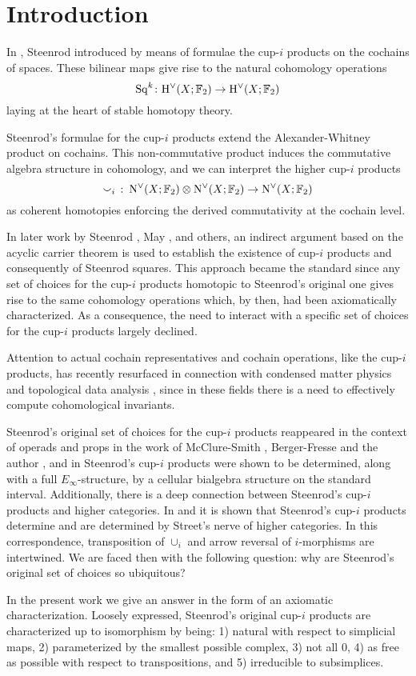 
\section{Introduction} \label{s:introduction}

In \cite{steenrod1947products}, Steenrod introduced by means of formulae the cup-$i$ products on the cochains of spaces.
These bilinear maps give rise to the natural cohomology operations
\[
\mathrm{Sq}^k \colon \mathrm{H}^\vee(X; {\mathbb{F}_2}) \to \mathrm{H}^\vee(X; {\mathbb{F}_2})
\]
laying at the heart of stable homotopy theory.

Steenrod's formulae for the cup-$i$ products extend the Alexander-Whitney product on cochains.
This non-commutative product induces the commutative algebra structure in cohomology, and we can interpret the higher cup-$i$ products
\[
\smallsmile_i\ \colon \operatorname{N^{\vee}}(X; {\mathbb{F}_2}) \otimes \operatorname{N^{\vee}}(X; {\mathbb{F}_2}) \to \operatorname{N^{\vee}}(X; {\mathbb{F}_2})
\]
as coherent homotopies enforcing the derived commutativity at the cochain level.

In later work by Steenrod \cite{steenrod1962cohomology}, May \cite{may1970general}, and others, an indirect argument based on the acyclic carrier theorem is used to establish the existence of cup-$i$ products and consequently of Steenrod squares.
This approach became the standard since any set of choices for the cup-$i$ products homotopic to Steenrod's original one gives rise to the same cohomology operations which, by then, had been axiomatically characterized.
As a consequence, the need to interact with a specific set of choices for the cup-$i$ products largely declined.

Attention to actual cochain representatives and cochain operations, like the \mbox{cup-$i$} products, has recently resurfaced in connection with condensed matter physics \cite{} and topological data analysis \cite{}, since in these fields there is a need to effectively compute cohomological invariants.

Steenrod's original set of choices for the cup-$i$ products reappeared in the context of operads and props in the work of McClure-Smith \cite{mcclure2003multivariable}, Berger-Fresse \cite{berger2004combinatorial} and the author \cite{medina2020prop1}, and in \cite{medina2021prop2} Steenrod's cup-$i$ products were shown to be determined, along with a full $E_\infty$-structure, by a cellular bialgebra structure on the standard interval.
Additionally, there is a deep connection between Steenrod's cup-$i$ products and higher categories.
In \cite{medina2020globular} and \cite{bibid} it is shown that Steenrod's cup-$i$ products determine and are determined by Street's nerve of higher categories.
In this correspondence, transposition of $\cup_i$ and arrow reversal of $i$-morphisms are intertwined.
We are faced then with the following question: why are Steenrod's original set of choices so ubiquitous?

In the present work we give an answer in the form of an axiomatic characterization.
Loosely expressed, Steenrod's original cup-$i$ products are characterized up to isomorphism by being: 1) natural with respect to simplicial maps, 2) parameterized by the smallest possible complex, 3) not all $0$, 4) as free as possible with respect to transpositions, and 5) irreducible to subsimplices.